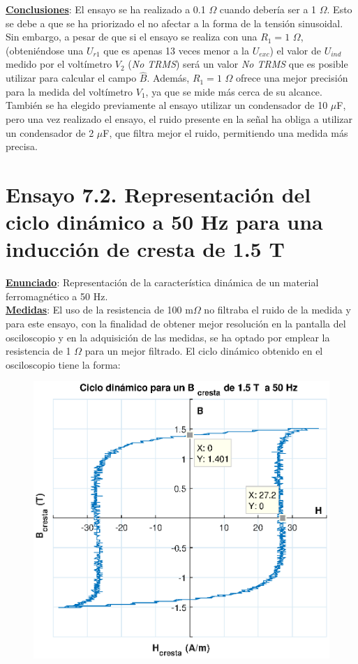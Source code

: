 \documentclass[a4paper,titlepage]{article}
\begin{document}
{{\noindent\textbf{\underline{Conclusiones}}:
El ensayo se ha realizado a 0.1 $\Omega$ cuando debería ser a 1 $\Omega$. Esto se debe a que se ha priorizado el no afectar a la forma de la tensión sinusoidal. Sin embargo, a pesar de que si el ensayo se realiza con una $R_1=1$ $\Omega$, (obteniéndose una $U_{r1}$ que es apenas 13 veces menor a la $U_{exc}$) el valor de $U_{ind}$ medido por el voltímetro $V_2$ (\textit{No TRMS}) será un valor \textit{No TRMS} que es posible utilizar para calcular el campo $\hat{B}$. Además, $R_1=1$ $\Omega$ ofrece una mejor precisión para la medida del voltímetro $V_1$, ya que se mide más cerca de su alcance. También se ha elegido previamente al ensayo utilizar un condensador de 10 $\mu$F, pero una vez realizado el ensayo, el ruido presente en la señal ha obliga a utilizar un condensador de 2 $\mu$F, que filtra mejor el ruido, permitiendo una medida más precisa.


\newpage
\section*{Ensayo 7.2. Representación del ciclo dinámico a 50 Hz para una inducción de cresta de 1.5 T}
\noindent\textbf{\underline{Enunciado}}: Representación de la característica dinámica de un material ferromagnético a 50 Hz.\\

\noindent\textbf{\underline{Medidas}}: El uso de la resistencia de 100 m$\Omega$ no filtraba el ruido de la medida y para este ensayo, con la finalidad de obtener mejor resolución en la pantalla del osciloscopio y en la adquisición de las medidas, se ha optado por emplear la resistencia de 1 $\Omega$ para un mejor filtrado. El ciclo dinámico obtenido en el osciloscopio tiene la forma:
\begin{figure}[ht]
 \centering
     \includegraphics[width=\textwidth]{ciclo1.eps}
\end{figure}


}}
\end{document}
